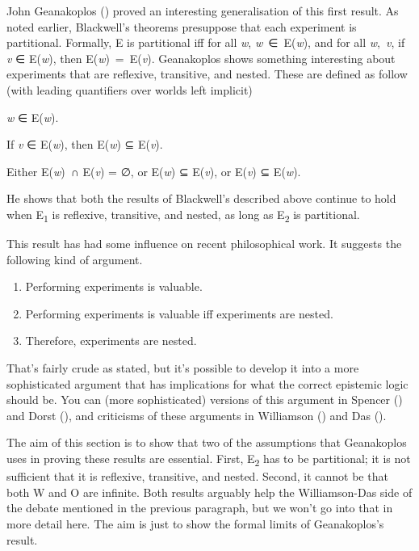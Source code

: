 \documentclass[
  10pt,
  letterpaper,
  DIV=11,
  numbers=noendperiod,
  twoside]{scrartcl}
\providecommand{\tightlist}{%
  \setlength{\itemsep}{0pt}\setlength{\parskip}{0pt}}\usepackage{longtable,booktabs,array}
\begin{document}
John Geanakoplos ()
proved an interesting generalisation of this first result. As noted
earlier, Blackwell's theorems presuppose that each experiment is
partitional. Formally, E is partitional iff for all \emph{w},
\emph{w}~∈~E(\emph{w}), and for all \emph{w},~\emph{v}, if \emph{v} ∈
E(\emph{w}), then E(\emph{w})~=~E(\emph{v}). Geanakoplos shows something
interesting about experiments that are reflexive, transitive, and
nested. These are defined as follow (with leading quantifiers over
worlds left implicit)

\begin{description}
\tightlist
\item[Reflexive]
\emph{w} ∈ E(\emph{w}).
\item[Transitive]
If \emph{v} ∈ E(\emph{w}), then E(\emph{w}) ⊆ E(\emph{v}).
\item[Nested]
Either E(\emph{w})~∩ E(\emph{v}) = ∅, or E(\emph{w}) ⊆ E(\emph{v}), or
E(\emph{v}) ⊆ E(\emph{w}).
\end{description}

He shows that both the results of Blackwell's described above continue
to hold when E\textsubscript{1} is reflexive, transitive, and nested, as
long as E\textsubscript{2} is partitional.

This result has had some influence on recent philosophical work. It
suggests the following kind of argument.

\begin{enumerate}
\def\labelenumi{\arabic{enumi}.}
\tightlist
\item
  Performing experiments is valuable.
\item
  Performing experiments is valuable iff experiments are nested.
\item
  Therefore, experiments are nested.
\end{enumerate}

That's fairly crude as stated, but it's possible to develop it into a
more sophisticated argument that has implications for what the correct
epistemic logic should be. You can (more sophisticated) versions of this
argument in Spencer () and Dorst
(), and criticisms of these arguments in
Williamson () and Das
().

The aim of this section is to show that two of the assumptions that
Geanakoplos uses in proving these results are essential. First,
E\textsubscript{2} has to be partitional; it is not sufficient that it
is reflexive, transitive, and nested. Second, it cannot be that both W
and O are infinite. Both results arguably help the Williamson-Das side
of the debate mentioned in the previous paragraph, but we won't go into
that in more detail here. The aim is just to show the formal limits of
Geanakoplos's result.
\end{document}
